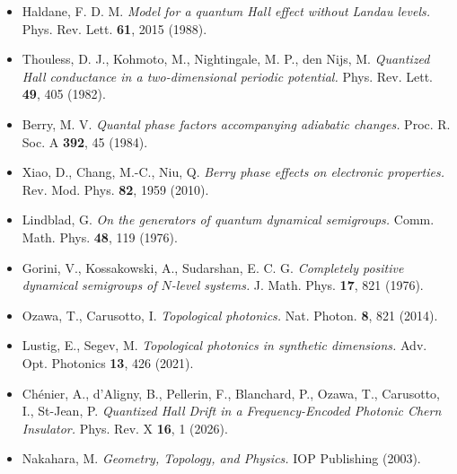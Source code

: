 \documentclass[11pt,a4paper]{article}
\begin{document}
\begin{itemize}[leftmargin=*,itemsep=2pt]
  \item Haldane, F. D. M. \emph{Model for a quantum Hall effect without Landau levels.} Phys. Rev. Lett. \textbf{61}, 2015 (1988).
  \item Thouless, D. J., Kohmoto, M., Nightingale, M. P., den Nijs, M. \emph{Quantized Hall conductance in a two-dimensional periodic potential.} Phys. Rev. Lett. \textbf{49}, 405 (1982).
  \item Berry, M. V. \emph{Quantal phase factors accompanying adiabatic changes.} Proc. R. Soc. A \textbf{392}, 45 (1984).
  \item Xiao, D., Chang, M.-C., Niu, Q. \emph{Berry phase effects on electronic properties.} Rev. Mod. Phys. \textbf{82}, 1959 (2010).
  \item Lindblad, G. \emph{On the generators of quantum dynamical semigroups.} Comm. Math. Phys. \textbf{48}, 119 (1976).
  \item Gorini, V., Kossakowski, A., Sudarshan, E. C. G. \emph{Completely positive dynamical semigroups of $N$-level systems.} J. Math. Phys. \textbf{17}, 821 (1976).
  \item Ozawa, T., Carusotto, I. \emph{Topological photonics.} Nat. Photon. \textbf{8}, 821 (2014).
  \item Lustig, E., Segev, M. \emph{Topological photonics in synthetic dimensions.} Adv. Opt. Photonics \textbf{13}, 426 (2021).
  \item Ch\'enier, A., d'Aligny, B., Pellerin, F., Blanchard, P., Ozawa, T., Carusotto, I., St-Jean, P. \emph{Quantized Hall Drift in a Frequency-Encoded Photonic Chern Insulator.} Phys. Rev. X \textbf{16}, 1 (2026).
  \item Nakahara, M. \emph{Geometry, Topology, and Physics.} IOP Publishing (2003).
\end{itemize}
\end{document}
